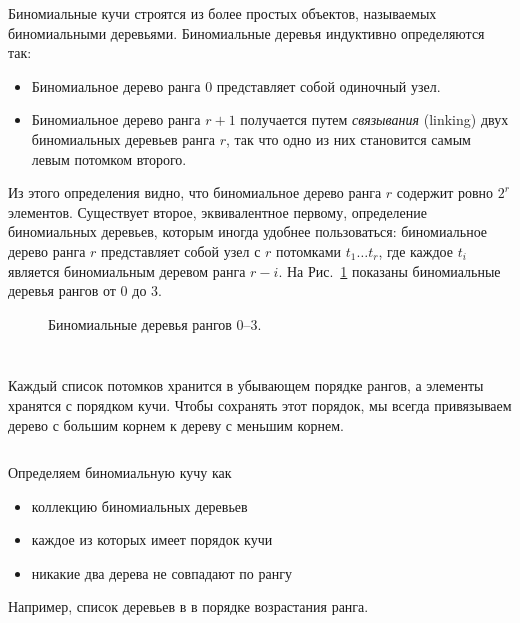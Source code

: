 \documentclass[aspectratio=169
  , xcolor={svgnames}
  , hyperref={ colorlinks,citecolor=DeepPink4
             , linkcolor=DarkRed,urlcolor=DarkBlue}
  , russian
  ]{beamer}
\newcommand{\term}[2]{\textit{#1} (#2)}
\theoremstyle{exerciseStyle1}
\begin{document}
\begin{frame}[fragile]{}
Биномиальные кучи строятся из более простых объектов, называемых
биномиальными деревьями. Биномиальные деревья индуктивно определяются
так:
\begin{itemize}
  \item Биномиальное дерево ранга 0 представляет собой одиночный узел.
  \item Биномиальное дерево ранга $r+1$ получается путем
  \term{связывания}{linking} двух биномиальных деревьев ранга $r$, так
  что одно из них становится самым левым потомком второго.
\end{itemize}
Из этого определения видно, что биномиальное дерево ранга $r$ содержит
ровно $2^r$ элементов.  Существует второе, эквивалентное первому,
определение биномиальных деревьев, которым иногда удобнее
пользоваться: биномиальное дерево ранга $r$ представляет собой узел
с $r$ потомками $t_1\ldots t_r$, где каждое $t_i$ является
биномиальным деревом ранга $r-i$.  На Рис.~\ref{fig:3.3} показаны
биномиальные деревья рангов от 0 до 3.
\end{frame}


\begin{frame}[fragile]{}
\begin{figure}[h]
  \centering
  
  \caption{Биномиальные деревья рангов 0--3.}
  \label{fig:3.3}
\end{figure}

\inputminted[firstline=5, lastline=6] {haskell}{code/BinomialHeap.lhs}

\end{frame}


\begin{frame}[fragile]{}
\inputminted[firstline=5, lastline=6] {haskell}{code/BinomialHeap.lhs}
Каждый список потомков хранится в убывающем порядке рангов, а элементы
хранятся с порядком кучи.  Чтобы сохранять этот порядок, мы всегда
привязываем дерево с большим корнем к дереву с меньшим корнем.
\inputminted[firstline=11, lastline=14] {haskell}{code/BinomialHeap.lhs}
\end{frame}


\begin{frame}[fragile]{}
Определяем биномиальную кучу как 
\begin{itemize}
  \item коллекцию биномиальных деревьев
  \item каждое из которых имеет порядок кучи
  \item никакие два дерева не совпадают по рангу
\end{itemize} 
Например, список деревьев в в порядке возрастания ранга.
\inputminted[firstline=6, lastline=6] {haskell}{code/BinomialHeap.lhs}
\end{frame}
\end{document}

